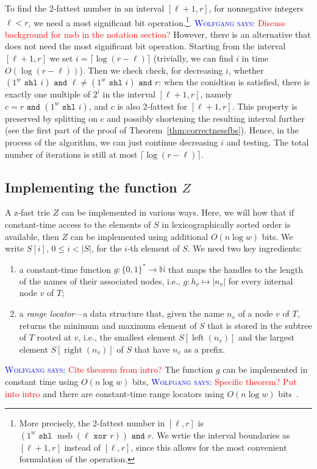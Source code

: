 \documentclass[a4paper,11pt]{article}
\newcommand{\N}{\mathbb{N}}
\newcommand{\?}{\mskip1.5mu}
\DeclareMathOperator{\lrange}{left}
\DeclareMathOperator{\rrange}{right}
\newcommand{\aremark}[3]{\textcolor{blue}{\textsc{#1 #2:}}
  \textcolor{red}{\textsf{#3}}}
\newcommand{\wolfgang}[2][says]{\aremark{Wolfgang}{#1}{#2}}
\begin{document}
To find the 2-fattest number in an interval $[\ell + 1, r]$, for 
nonnegative integers $\ell < r$, we need 
a most significant bit operation.\footnote{More precisely, the 
2-fattest number in $[\ell, r]$ is 
$(1^w \texttt{ shl } 
\operatorname{msb}(\ell \texttt{ xor } r)) \texttt{ and } r$. 
We wrtie the interval boundaries as $[\ell +1 , r]$ instead of
$[\ell, r]$, since this allows for the most convenient formulation
of the operation.}.
\wolfgang{Discuss background for msb in the notation section?}
However, there is an alternative that does not need the most 
significant bit operation.  Starting from the interval $[\ell + 1, r]$
we set $i = \lceil\log(r - \ell)\rceil$ (trivially, we can find $i$ 
in time $O(\log(r -\ell))$).
Then we check check, for decreasing $i$, whether 
$(1^w \texttt{ shl } i)\texttt{ and } \ell \neq 
 (1^w \texttt{ shl } i) \texttt{ and } r$: 
when the conidtion is satisfied, there is exactly one multiple of 
$2^i$ in the interval $[\ell + 1, r]$, 
namely $c= r \texttt{ and }  (1^w \texttt{ shl } i)$, and
$c$ is also 2-fattest for $[\ell + 1, r]$. This property is preserved 
by splitting on $c$ and possibly shortening the resulting interval
further (see the first part of the proof of 
Theorem~\ref{thm:correctnessfbs}). Hence, in the process of
the algorithm, we can just continue decreasing $i$ and testing. 
The total number of iterations is still at most 
$\lceil\log(r-\ell)\rceil$.

\subsection{Implementing the function $Z$}

A z-fast trie $Z$ can be implemented in various ways. 
Here, we will how that if constant-time access to the 
elements of $S$ in lexicographically sorted order is 
available, then $Z$ can be implemented using additional 
$O(n\log w)$ bits. We write $S[i]$, $0 \leq i < |S|$, 
for the $i$-th element of $S$. We need two key
ingredients:
\begin{enumerate}
  \item a constant-time function $g: \{0,1\}^* \rightarrow \N$ that 
    maps the handles to the length of the names of their associated 
    nodes, i.e., $g: h_v \mapsto |n_v|$ for every internal node $v$ 
    of $T$;
  \item a \emph{range locator}---a data structure that, given the 
  name $n_v$ of a node $v$ of $T$, returns the minimum and
  maximum element of $S$ that is stored in the subtree of $T$
  rooted at $v$, i.e., the smallest element $S[\lrange(n_v)]$ and the 
  largest element $S[\rrange(n_v)]$ of $S$ that
  have $n_v$ as a prefix.
\end{enumerate}
\wolfgang{Cite theorem from intro?}
The function $g$ can be implemented in constant time 
using $O(n\log w)$ bits,
\wolfgang{Specific theorem? Put into intro}
and there are constant-time range locators using $O(n\log w)$
bits~\cite{BelazzouguiBoPaVi09}.
\end{document}
